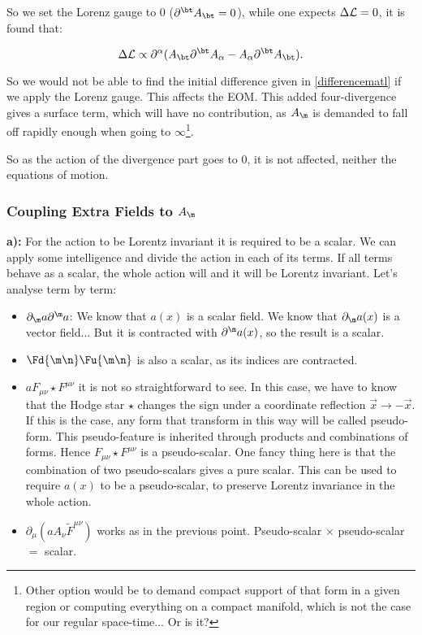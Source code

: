 So we set the Lorenz gauge to 0 ($\pu{\bt}\vad{\bt}=0$), while one expects $\Delta\mathcal{L} = 0$, it is found that:

\begin{equation}
	\Delta \matL \propto \pu{\alpha}(\vad{\bt}\pu{\bt}\vad{\alpha} - \vad{\alpha} \pu{\bt}\vad{\bt}).
\end{equation}

So we would not be able to find the initial difference given in \ref{differencematl} if we apply the Lorenz gauge. This affects the EOM. This added four-divergence gives a surface term, which will have no contribution, as $\vad{\m}$ is demanded to fall off rapidly enough when going to $\infty$\footnote{Other option would be to demand compact support of that form in a given region or computing everything on a compact manifold, which is not the case for our regular space-time... Or is it?}.

So as the action of the divergence part goes to 0, it is not affected, neither the equations of motion.

\subsubsection{Coupling Extra Fields to $\vad{\m}$}\label{Coupling Extra Fields to amu}

\textbf{a):}
For the action to be Lorentz invariant it is required to be a scalar. We can apply some intelligence and divide the action in each of its terms. If all terms behave as a scalar, the whole action will and it will be Lorentz invariant. Let's analyse term by term:

\begin{itemize}
	\item $\pd{\m} a \pu{\m} a$:  We know that $a(x)$ is a scalar field. We know that $\pd{\m}a(x)$ is a vector field... But it is contracted with $\pu{\m}a(x)$, so the result is a scalar.
	
	\item $\Fd{\m\n}\Fu{\m\n}$ is also a scalar, as its indices are contracted.
	
	\item $a F_{\mu \nu} \star F^{ \mu \nu}$ it is not so straightforward to see. In this case, we have to know that the Hodge star $\star$ changes the sign under a coordinate reflection $\vec{x}\rightarrow -\vec{x}$. If this is the case, any form that transform in this way will be called pseudo-form. This pseudo-feature is inherited through products and combinations of forms. Hence $F_{\mu \nu} \star F^{ \mu \nu}$ is a pseudo-scalar. One fancy thing here is that the combination of two pseudo-scalars gives a pure scalar. This can be used to require $a(x)$ to be a pseudo-scalar, to preserve Lorentz invariance in the whole action.
	
	\item $\partial_{\mu}\left(a A_{\nu} \tilde{F}^{\mu \nu}\right)$ works as in the previous point. Pseudo-scalar $\times$ pseudo-scalar $=$ scalar.
\end{itemize}


